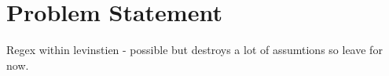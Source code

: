 
\section{Problem Statement}
\label{sec:problem}

Regex within levinstien - possible but destroys a lot of assumtions so leave for now.
